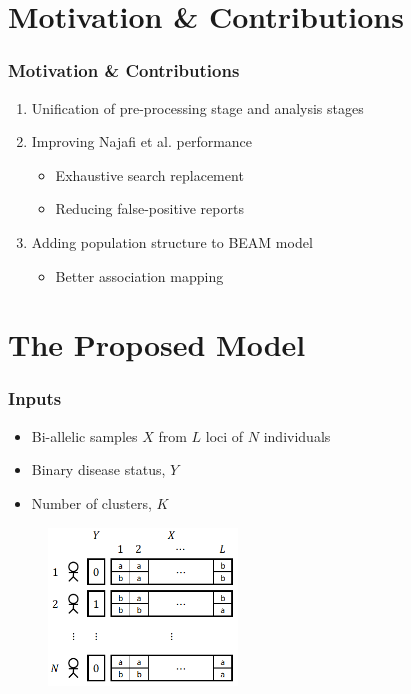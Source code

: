 \documentclass[xcolor=dvipsnames, professionalfont]{beamer}
\begin{document}
\section{Motivation \& Contributions}
\begin{frame}
\frametitle{Motivation \& Contributions}
\begin{enumerate}
\item Unification of pre-processing stage and analysis stages \pause
\item Improving Najafi et al. performance
	\begin{itemize}
	\item Exhaustive search replacement
	\item Reducing false-positive reports
	\end{itemize} \pause
\item Adding population structure to BEAM model
	\begin{itemize}
	\item Better association mapping
	\end{itemize}
\end{enumerate}
\end{frame}



\section{The Proposed Model}
\begin{frame}
\frametitle{Inputs}
\begin{itemize}
\item Bi-allelic samples $X$ from $L$ loci of $N$ individuals
\item Binary disease status, $Y$
\item Number of clusters, $K$
\end{itemize}
%
\begin{figure}[!ht]
\centering
\includegraphics[height=4.2cm]{imgs/Inputs}
\end{figure}
\end{frame}
\end{document}
